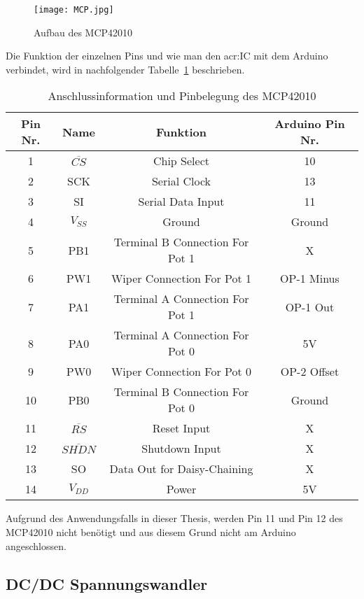 \begin{figure}[H]
	\centering
	\texttt{[image: MCP.jpg]}
	\caption[Aufbau des MCP42010]{Aufbau des MCP42010} 
	\cite{MCP42}
	\label{fig:MCP}
\end{figure}

Die Funktion der einzelnen Pins und wie man den \gls{acr:IC} mit dem Arduino verbindet, wird in nachfolgender Tabelle~\ref{tab:pinmcp} beschrieben. 

\begin{table}[htb]
	\begin{center}
		\begin{tabular}[H]{cccc}	
			\toprule
			\textbf{Pin Nr.} & \textbf{Name}  &\textbf{Funktion} & \textbf{Arduino Pin Nr.} \\
			\midrule
			1 & $\overline{CS}$ & Chip Select &  10 \\
			2 & SCK & Serial Clock &  13 \\
			3 & SI & Serial Data Input&  11 \\
			4 & $V_{SS}$ & Ground &  Ground \\
			5 & PB1 & Terminal B Connection For Pot 1 & X \\
			6 & PW1 & Wiper Connection For Pot 1 &  OP-1 Minus \\
			7 & PA1& Terminal A Connection For Pot 1 &  OP-1 Out  \\
			8 & PA0& Terminal A Connection For Pot 0 &  5V \\
			9 & PW0& Wiper Connection For Pot 0 & OP-2 Offset \\
			10 & PB0 & Terminal B Connection For Pot 0 &  Ground \\
			11 & $\overline{RS}$ & Reset Input & X  \\
			12 & $\overline{SHDN}$ & Shutdown Input &X\\
			13 & SO & Data Out for Daisy-Chaining & X \\
			14 & $V_{DD}$ & Power & 5V \\
			\bottomrule
		\end{tabular}
		\caption{Anschlussinformation und Pinbelegung des MCP42010}
		\label{tab:pinmcp}
	\end{center}
\end{table}

Aufgrund des Anwendungsfalls in dieser Thesis, werden Pin 11 und Pin 12 des MCP42010 nicht benötigt und aus diesem Grund nicht am Arduino angeschlossen. 

\subsection{DC/DC Spannungswandler}
\label{subsec:dcdc}

